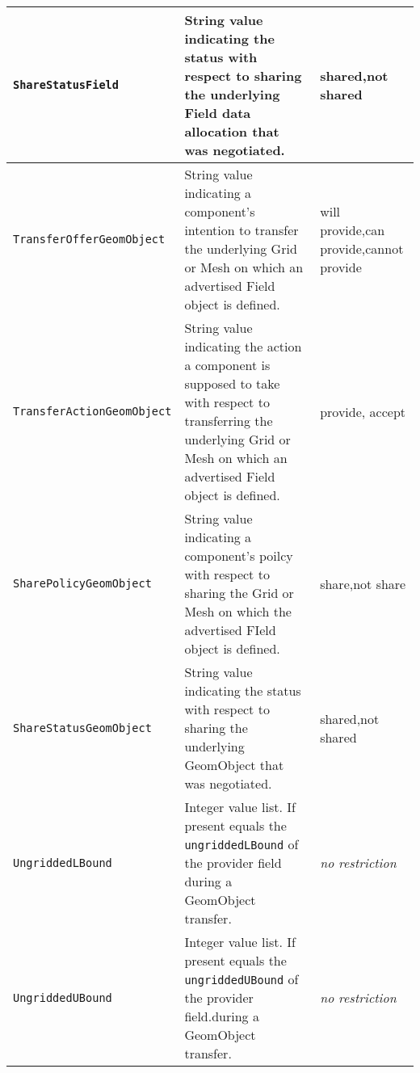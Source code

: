 \begin{longtable}{|p{}|p{}|p{}|}
     {\tt ShareStatusField} & String value indicating the status with respect to sharing the underlying Field data allocation that was negotiated.& shared,\newline not shared\\ \hline
     {\tt TransferOfferGeomObject} & String value indicating a component's intention to transfer the underlying Grid or Mesh on which an advertised Field object is defined.& will provide,\newline can provide,\newline cannot provide\\ \hline
     {\tt TransferActionGeomObject} & String value indicating the action a component is supposed to take with respect to transferring the underlying Grid or Mesh on which an advertised Field object is defined.& provide, accept\\ \hline
     {\tt SharePolicyGeomObject} & String value indicating a component's poilcy with respect to sharing the Grid or Mesh on which the advertised FIeld object is defined.& share,\newline not share\\ \hline
     {\tt ShareStatusGeomObject} & String value indicating the status with respect to sharing the underlying GeomObject that was negotiated.& shared,\newline not shared\\ \hline
     {\tt UngriddedLBound} & Integer value list. If present equals the {\tt ungriddedLBound} of the provider field during a GeomObject transfer. & {\em no restriction}\\ \hline
     {\tt UngriddedUBound} & Integer value list. If present equals the {\tt ungriddedUBound} of the provider field.during a GeomObject transfer. & {\em no restriction}\\ \hline
     \hline
\end{longtable}
